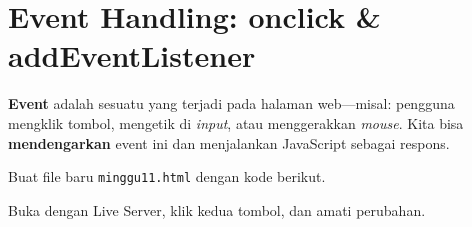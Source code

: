 \section{Event Handling: onclick \& addEventListener}
\label{sec:11-event-basic}

\textbf{Event} adalah sesuatu yang terjadi pada halaman web---misal: pengguna mengklik tombol, mengetik di \emph{input}, atau menggerakkan \emph{mouse}. Kita bisa \textbf{mendengarkan} event ini dan menjalankan JavaScript sebagai respons.

\begin{langkah}
  \item Buat file baru \texttt{minggu11.html} dengan kode berikut.
  \item Buka dengan Live Server, klik kedua tombol, dan amati perubahan.
\end{langkah}

